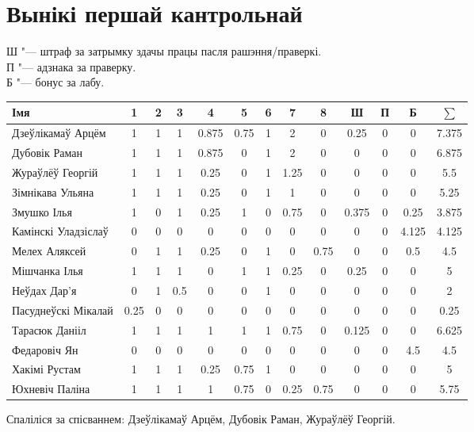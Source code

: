 \documentclass[12pt, a4paper]{extarticle}
\begin{document}
    \section{Вынікі першай кантрольнай}
    \noindent Ш "--- штраф за затрымку здачы працы пасля рашэння/праверкі. \\
    П "--- адзнака за праверку. \\
    Б "--- бонус за лабу.
    \begin{table}[H]
        \begin{minipage}{\textwidth}
            \begin{tabular}{|l|c|c|c|c|c|c|c|c|c|c|c|c|}
                \hline
                Імя                 &  1   & 2 & 3 &   4   &  5   & 6 &  7   &  8   &   Ш   & П &   Б   & $\sum$ \\ \hline
                Дзеўлікамаў Арцём   &  1   & 1 & 1 & 0.875 & 0.75 & 1 &  2   &  0   &  0.25 & 0 &   0   &  7.375 \\ \hline
                Дубовік Раман       &  1   & 1 & 1 & 0.875 &  0   & 1 &  2   &  0   &   0   & 0 &   0   &  6.875 \\ \hline
                Жураўлёў Георгій    &  1   & 1 & 1 &  0.25 &  0   & 1 & 1.25 &  0   &   0   & 0 &   0   &   5.5  \\ \hline
                Зімнікава Ульяна    &  1   & 1 & 1 &  0.25 &  0   & 1 &  1   &  0   &   0   & 0 &   0   &  5.25  \\ \hline
                Змушко Ілья         &  1   & 0 & 1 &  0.25 &  1   & 0 & 0.75 &  0   & 0.375 & 0 &  0.25 &  3.875 \\ \hline
                Камінскі Уладзіслаў &  0   & 0 & 0 &   0   &  0   & 0 &  0   &  0   &   0   & 0 & 4.125 &  4.125 \\ \hline
                Мелех Аляксей       &  0   & 1 & 1 &  0.25 &  0   & 1 &  0   & 0.75 &   0   & 0 &  0.5  &   4.5  \\ \hline
                Мішчанка Ілья       &  1   & 1 & 1 &   0   &  1   & 1 & 0.25 &  0   &  0.25 & 0 &   0   &   5    \\ \hline
                Неўдах Дар'я        &  0   & 1 & 0.5\footnotemark & 0 & 0& 1 & 0& 0 &   0   & 0 &   0   &   2    \\ \hline
                Пасуднеўскі Мікалай & 0.25 & 0 & 0 &   0   &  0   & 0 &  0   &  0   &   0   & 0 &   0   &  0.25  \\ \hline
                Тарасюк Данііл      &  1   & 1 & 1 &   1   &  1   & 1 & 0.75 &  0   & 0.125 & 0 &   0   &  6.625 \\ \hline
                Федаровіч Ян        &  0   & 0 & 0 &   0   &  0   & 0 &  0   &  0   &   0   & 0 &  4.5  &   4.5  \\ \hline
                Хакімі Рустам       &  1   & 1 & 1 &  0.25 & 0.75 & 1 &  0   &  0   &   0   & 0 &   0   &   5    \\ \hline
                Юхневіч Паліна      &  1   & 1 & 1 &   1   & 0.75 & 0 & 0.25 & 0.75 &   0   & 0 &   0   &  5.75  \\ \hline
            \end{tabular}
        \end{minipage}
    \end{table}
    \noindent Спаліліся за спісваннем: Дзеўлікамаў Арцём, Дубовік Раман, Жураўлёў Георгій.
\end{document}
